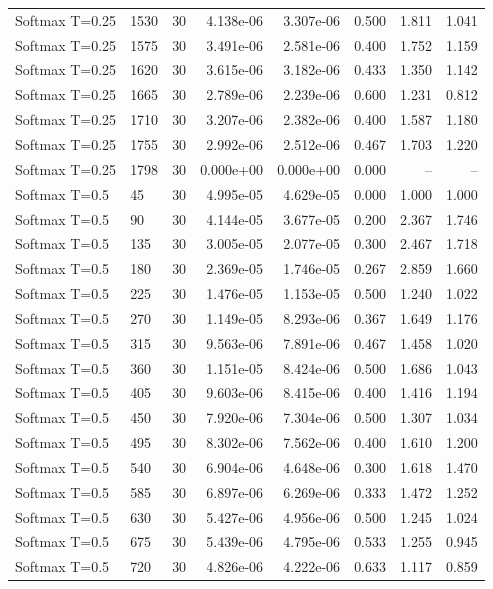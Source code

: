 \begin{scriptsize}
\begin{longtable}{llrrrrrr}
Softmax T=0.25 & 1530 & 30 & 4.138e-06 & 3.307e-06 & 0.500 & 1.811 & 1.041 \\
Softmax T=0.25 & 1575 & 30 & 3.491e-06 & 2.581e-06 & 0.400 & 1.752 & 1.159 \\
Softmax T=0.25 & 1620 & 30 & 3.615e-06 & 3.182e-06 & 0.433 & 1.350 & 1.142 \\
Softmax T=0.25 & 1665 & 30 & 2.789e-06 & 2.239e-06 & 0.600 & 1.231 & 0.812 \\
Softmax T=0.25 & 1710 & 30 & 3.207e-06 & 2.382e-06 & 0.400 & 1.587 & 1.180 \\
Softmax T=0.25 & 1755 & 30 & 2.992e-06 & 2.512e-06 & 0.467 & 1.703 & 1.220 \\
Softmax T=0.25 & 1798 & 30 & 0.000e+00 & 0.000e+00 & 0.000 & -- & -- \\
Softmax T=0.5 & 45 & 30 & 4.995e-05 & 4.629e-05 & 0.000 & 1.000 & 1.000 \\
Softmax T=0.5 & 90 & 30 & 4.144e-05 & 3.677e-05 & 0.200 & 2.367 & 1.746 \\
Softmax T=0.5 & 135 & 30 & 3.005e-05 & 2.077e-05 & 0.300 & 2.467 & 1.718 \\
Softmax T=0.5 & 180 & 30 & 2.369e-05 & 1.746e-05 & 0.267 & 2.859 & 1.660 \\
Softmax T=0.5 & 225 & 30 & 1.476e-05 & 1.153e-05 & 0.500 & 1.240 & 1.022 \\
Softmax T=0.5 & 270 & 30 & 1.149e-05 & 8.293e-06 & 0.367 & 1.649 & 1.176 \\
Softmax T=0.5 & 315 & 30 & 9.563e-06 & 7.891e-06 & 0.467 & 1.458 & 1.020 \\
Softmax T=0.5 & 360 & 30 & 1.151e-05 & 8.424e-06 & 0.500 & 1.686 & 1.043 \\
Softmax T=0.5 & 405 & 30 & 9.603e-06 & 8.415e-06 & 0.400 & 1.416 & 1.194 \\
Softmax T=0.5 & 450 & 30 & 7.920e-06 & 7.304e-06 & 0.500 & 1.307 & 1.034 \\
Softmax T=0.5 & 495 & 30 & 8.302e-06 & 7.562e-06 & 0.400 & 1.610 & 1.200 \\
Softmax T=0.5 & 540 & 30 & 6.904e-06 & 4.648e-06 & 0.300 & 1.618 & 1.470 \\
Softmax T=0.5 & 585 & 30 & 6.897e-06 & 6.269e-06 & 0.333 & 1.472 & 1.252 \\
Softmax T=0.5 & 630 & 30 & 5.427e-06 & 4.956e-06 & 0.500 & 1.245 & 1.024 \\
Softmax T=0.5 & 675 & 30 & 5.439e-06 & 4.795e-06 & 0.533 & 1.255 & 0.945 \\
Softmax T=0.5 & 720 & 30 & 4.826e-06 & 4.222e-06 & 0.633 & 1.117 & 0.859 \\

\end{longtable}
\end{scriptsize}
